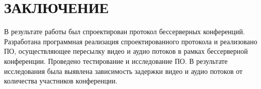 \chapter*{ЗАКЛЮЧЕНИЕ}

В результате работы был спроектирован протокол бессерверных конференций. Разработана программная реализация спроектированного протокола и реализовано ПО, осуществляющее пересылку видео и аудио потоков в рамках бессерверной конференции. Проведено тестирование и исследование ПО. В результате исследования была выявлена зависимость задержки видео и аудио потоков от количества участников конференции.

